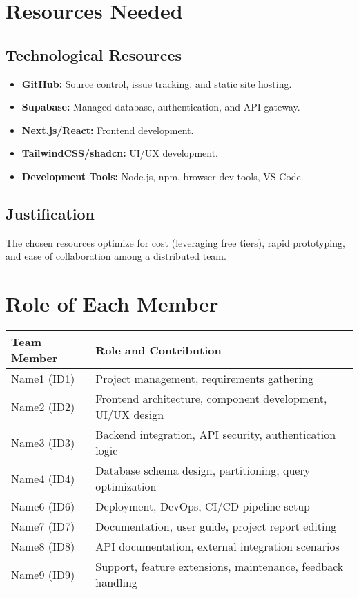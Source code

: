 \documentclass[12pt,a4paper]{report}
\begin{document}
\chapter{Resources Needed}
\section{Technological Resources}
\begin{itemize}
    \item \textbf{GitHub:} Source control, issue tracking, and static site hosting.
    \item \textbf{Supabase:} Managed database, authentication, and API gateway.
    \item \textbf{Next.js/React:} Frontend development.
    \item \textbf{TailwindCSS/shadcn:} UI/UX development.
    \item \textbf{Development Tools:} Node.js, npm, browser dev tools, VS Code.
\end{itemize}

\section{Justification}
The chosen resources optimize for cost (leveraging free tiers), rapid prototyping, and ease of collaboration among a distributed team.

\chapter{Role of Each Member}
\begin{longtable}{|p{}|p{}|}
    \hline
    \textbf{Team Member} & \textbf{Role and Contribution} \\
    \hline
    Name1 (ID1) & Project management, requirements gathering \\
    Name2 (ID2) & Frontend architecture, component development, UI/UX design \\
    Name3 (ID3) & Backend integration, API security, authentication logic \\
    Name4 (ID4) & Database schema design, partitioning, query optimization \\
    Name6 (ID6) & Deployment, DevOps, CI/CD pipeline setup \\
    Name7 (ID7) & Documentation, user guide, project report editing \\
    Name8 (ID8) & API documentation, external integration scenarios \\
    Name9 (ID9) & Support, feature extensions, maintenance, feedback handling \\
    \hline
\end{longtable}
\end{document}

